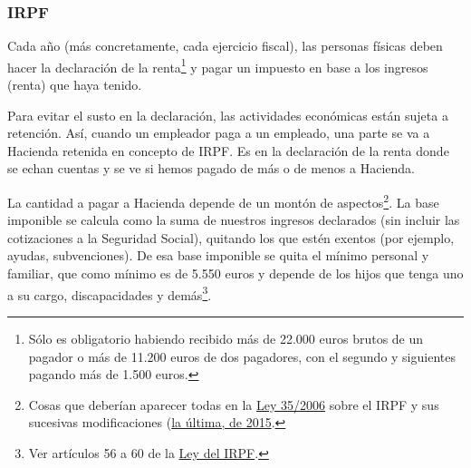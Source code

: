 \documentclass[nochap,palatino,shortheader]{apuntes}
\begin{document}
\subsubsection{IRPF}

Cada año (más concretamente, cada ejercicio fiscal), las personas físicas deben hacer la declaración de la renta\footnote{Sólo es obligatorio habiendo recibido más de 22.000 euros brutos de un pagador o más de 11.200 euros de dos pagadores, con el segundo y siguientes pagando más de 1.500 euros.} y pagar un impuesto en base a los ingresos (renta) que haya tenido.

Para evitar el susto en la declaración, las actividades económicas están sujeta a retención. Así, cuando un empleador paga a un empleado, una parte se va a Hacienda retenida en concepto de IRPF\footnotemark. Es en la declaración de la renta donde se echan cuentas y se ve si hemos pagado de más o de menos a Hacienda.


La cantidad a pagar a Hacienda depende de un montón de aspectos\footnote{Cosas que deberían aparecer todas en la \href{https://www.boe.es/buscar/act.php?id=BOE-A-2006-20764&tn=1&vd=&p=20151030}{Ley 35/2006} sobre el IRPF y sus sucesivas modificaciones (\href{http://www.boe.es/diario_boe/txt.php?id=BOE-A-2015-7765}{la última, de 2015}.}. La base imponible se calcula como la suma de nuestros ingresos declarados (sin incluir las cotizaciones a la Seguridad Social), quitando los que estén exentos (por ejemplo, ayudas, subvenciones). De esa base imponible se quita el mínimo personal y familiar, que como mínimo es de 5.550 euros y depende de los hijos que tenga uno a su cargo, discapacidades y demás\footnote{Ver artículos 56 a 60 de la \href{https://www.boe.es/buscar/act.php?id=BOE-A-2006-20764&b=29&tn=1&p=20141128}{Ley del IRPF}.}.
\end{document}
